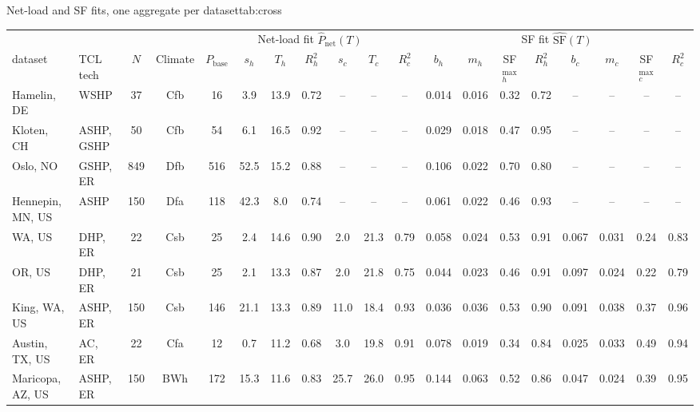\begin{autotable}
{Net-load and SF fits, one aggregate per dataset}{tab:cross}
\setlength{\tabcolsep}{3.5pt}
\begin{tabular}{llccccccccccccccccc}
\toprule
 & & & & \multicolumn{7}{c}{Net-load fit $\hat{P}_{\mathrm{net}}(T)$} & \multicolumn{8}{c}{SF fit $\hat{\mathrm{SF}}(T)$}\\
\cmidrule(lr){5-11}\cmidrule(lr){12-19}
dataset & TCL tech & $N$ & Climate & $P_{\mathrm{base}}$ & $s_h$ & $T_h$ & $R^2_h$ & $s_c$ & $T_c$ & $R^2_c$ & $b_h$ & $m_h$ & SF$^{\max}_h$ & $R^2_h$ & $b_c$ & $m_c$ & SF$^{\max}_c$ & $R^2_c$ \\
\midrule
Hamelin, DE~\cite{Sch22} & WSHP & 37 & Cfb & 16 & 3.9 & 13.9 & 0.72 & -- & -- & -- & 0.014 & 0.016 & 0.32 & 0.72 & -- & -- & -- & -- \\
Kloten, CH~\cite{Bru25,Kai26b} & ASHP, GSHP & 50 & Cfb & 54 & 6.1 & 16.5 & 0.92 & -- & -- & -- & 0.029 & 0.018 & 0.47 & 0.95 & -- & -- & -- & -- \\
Oslo, NO~\cite{cofactor} & GSHP, ER & 849 & Dfb & 516 & 52.5 & 15.2 & 0.88 & -- & -- & -- & 0.106 & 0.022 & 0.70 & 0.80 & -- & -- & -- & -- \\
Hennepin, MN, US~\cite{resstock}\tnote{a} & ASHP & 150 & Dfa & 118 & 42.3 & 8.0 & 0.74 & -- & -- & -- & 0.061 & 0.022 & 0.46 & 0.93 & -- & -- & -- & -- \\
WA, US~\cite{neea_eulr}\tnote{a} & DHP, ER & 22 & Csb & 25 & 2.4 & 14.6 & 0.90 & 2.0 & 21.3 & 0.79 & 0.058 & 0.024 & 0.53 & 0.91 & 0.067 & 0.031 & 0.24 & 0.83 \\
OR, US~\cite{neea_eulr}\tnote{a} & DHP, ER & 21 & Csb & 25 & 2.1 & 13.3 & 0.87 & 2.0 & 21.8 & 0.75 & 0.044 & 0.023 & 0.46 & 0.91 & 0.097 & 0.024 & 0.22 & 0.79 \\
King, WA, US~\cite{resstock} & ASHP, ER & 150 & Csb & 146 & 21.1 & 13.3 & 0.89 & 11.0 & 18.4 & 0.93 & 0.036 & 0.036 & 0.53 & 0.90 & 0.091 & 0.038 & 0.37 & 0.96 \\
Austin, TX, US~\cite{pecanstreet} & AC, ER & 22 & Cfa & 12 & 0.7 & 11.2 & 0.68 & 3.0 & 19.8 & 0.91 & 0.078 & 0.019 & 0.34 & 0.84 & 0.025 & 0.033 & 0.49 & 0.94 \\
Maricopa, AZ, US~\cite{resstock} & ASHP, ER & 150 & BWh & 172 & 15.3 & 11.6 & 0.83 & 25.7 & 26.0 & 0.95 & 0.144 & 0.063 & 0.52 & 0.86 & 0.047 & 0.024 & 0.39 & 0.95 \\
\bottomrule
\end{tabular}
\end{autotable}